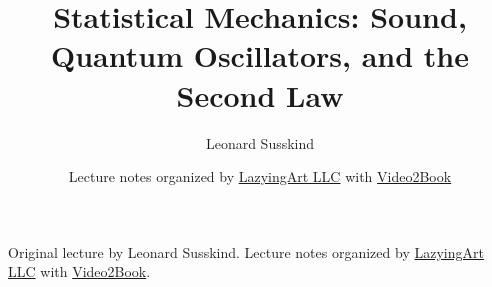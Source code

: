\documentclass[11pt,oneside]{book}
\begin{document}
\frontmatter
\hypersetup{pageanchor=false}
\title{Statistical Mechanics: Sound, Quantum Oscillators, and the Second Law}
\author{Leonard Susskind}
\date{Lecture notes organized by \href{https://lazying.art}{LazyingArt LLC} with \href{https://github.com/lachlanchen/Video2Book}{Video2Book}}
\maketitle
\begin{center}
\small Original lecture by Leonard Susskind. Lecture notes organized by \href{https://lazying.art}{LazyingArt LLC} with \href{https://github.com/lachlanchen/Video2Book}{Video2Book}.
\end{center}
\clearpage
\hypersetup{pageanchor=true}
\mainmatter

\end{document}
